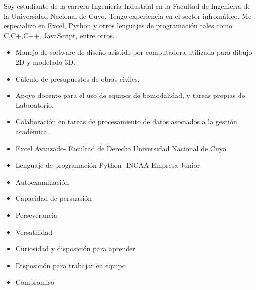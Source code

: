 \documentclass[10pt,a4paper,ragged2e,withhyper]{altacv}
\begin{document}
\begin{paracol}{2}
Soy estudiante de la carrera Ingeniería Industrial en la Facultad de Ingeniería de la Universidad Nacional de Cuyo. Tengo experiencia en el sector infromático. Me especializo en Excel, Python y otros lenguajes de programación tales como C,C+,C++, JavaScript, entre otros.


\begin{itemize}
\item Manejo de software de diseño asistido por computadora utilizada para dibujo 2D y modelado 3D.
\item Cálculo de presupuestos de obras civiles.
\end{itemize}

\divider

\begin{itemize}
\item Apoyo docente para el uso de equipos de bomodalidad, y tareas propias de Laboratorio.
\item Colaboración en tareas de procesamiento de datos asociados a la gestión académica.
\end{itemize}


\begin{itemize}

\item Excel Avanzado- Facultad de Derecho Universidad Nacional de Cuyo
\item Lenguaje de programación Python- INCAA Empresa Junior 
\end{itemize}

\divide
\switchcolumn


\begin{itemize}
\item Autoexaminación
\item Capacidad de persuasión
\item Perseverancia
\item Versatilidad
\item Curiosidad y disposición para aprender
\item Disposición para trabajar en equipo
\item  Compromiso
\end{itemize}


\end{paracol}
\end{document}

